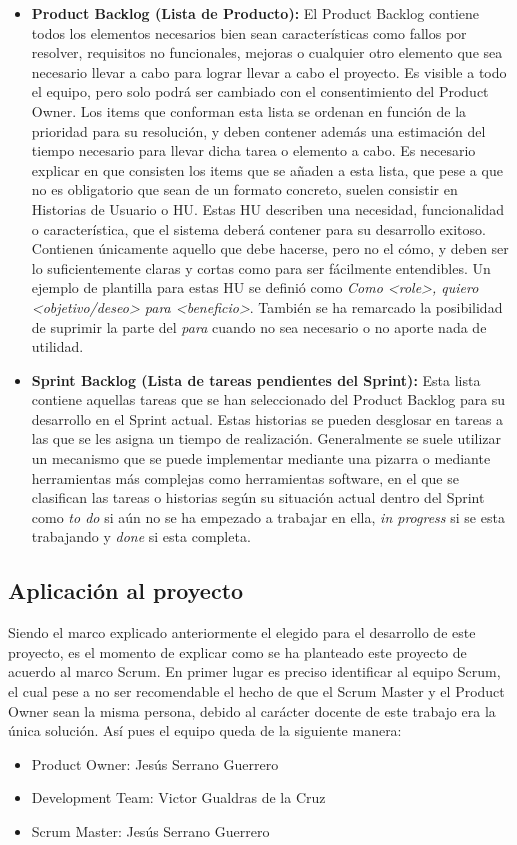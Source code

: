 \begin{itemize}
\item \textbf{Product Backlog (Lista de Producto):} El Product Backlog contiene todos los elementos necesarios bien sean características como fallos por resolver, requisitos no funcionales, mejoras o cualquier otro elemento que sea necesario llevar a cabo para lograr llevar a cabo el proyecto. Es visible a todo el equipo, pero solo podrá ser cambiado con el consentimiento del Product Owner. Los items que conforman esta lista se ordenan en función de la prioridad para su resolución, y deben contener además una estimación del tiempo necesario para llevar dicha tarea o elemento a cabo. Es necesario explicar en que consisten los items que se añaden a esta lista, que pese a que no es obligatorio que sean de un formato concreto, suelen consistir en Historias de Usuario o \acs{HU}. Estas \acs{HU} describen una necesidad, funcionalidad o característica, que el sistema deberá contener para su desarrollo exitoso. Contienen únicamente aquello que debe hacerse, pero no el cómo, y deben ser lo suficientemente claras y cortas como para ser fácilmente entendibles. Un ejemplo de plantilla para estas \acs{HU} se definió como \textit{Como <role>, quiero <objetivo/deseo> para <beneficio>}. También se ha remarcado la posibilidad de suprimir la parte del \textit{para} cuando no sea necesario o no aporte nada de utilidad. 

\item \textbf{Sprint Backlog (Lista de tareas pendientes del Sprint):} Esta lista contiene aquellas tareas que se han seleccionado del Product Backlog para su desarrollo en el Sprint actual. Estas historias se pueden desglosar en tareas a las que se les asigna un tiempo de realización. Generalmente se suele utilizar un mecanismo que se puede implementar mediante una pizarra o mediante herramientas más complejas como herramientas software, en el que se clasifican las tareas o historias según su situación actual dentro del Sprint como \textit{to do} si aún no se ha empezado a trabajar en ella, \textit{in progress} si se esta trabajando y \textit{done} si esta completa.
\end{itemize}

\subsection{Aplicación al proyecto} 

Siendo el marco explicado anteriormente el elegido para el desarrollo de este proyecto, es el momento de explicar como se ha planteado este proyecto de acuerdo al marco Scrum.
En primer lugar es preciso identificar al equipo Scrum, el cual pese a no ser recomendable el hecho de que el Scrum Master y el Product Owner sean la misma persona, debido al carácter docente de este trabajo era la única solución. Así pues el equipo queda de la siguiente manera:
\begin{itemize}
\item Product Owner: Jesús Serrano Guerrero
\item Development Team: Victor Gualdras de la Cruz
\item Scrum Master: Jesús Serrano Guerrero
\end{itemize}

